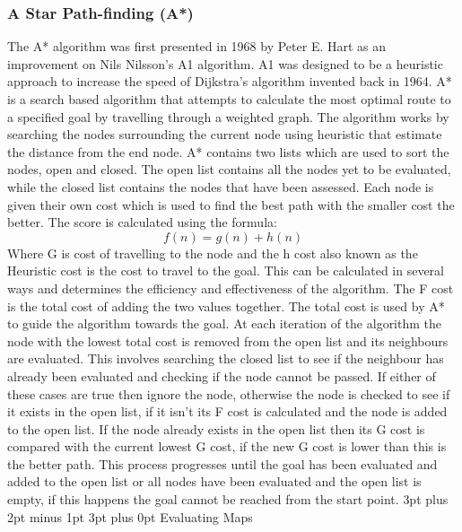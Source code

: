 \documentclass[12pt,a4paper,oneside]{book}
\makeatletter
\renewcommand\subsection{\@startsection {subsection}{1}{2mm} %
                               {3pt plus 2pt minus 1pt} %
                               {3pt plus 0pt} %
                               {\normalfont\bfseries}}
\makeatother
\begin{document}
\subsubsection{A Star Path-finding (A*)}
The A* algorithm was first presented in 1968 by Peter E. Hart as an improvement on Nils Nilsson’s A1 algorithm. A1 was designed to be a heuristic approach to increase the speed of Dijkstra’s algorithm invented back in 1964. A* is a search based algorithm that attempts to calculate the most optimal route to a specified goal by travelling through a weighted graph. 
\vspace{5mm} 
\newline
The algorithm works by searching the nodes surrounding the current node using heuristic that estimate the distance from the end node.  A* contains two lists which are used to sort the nodes, open and closed. The open list contains all the nodes yet to be evaluated, while the closed list contains the nodes that have been assessed. Each node is given their own cost which is used to find the best path with the smaller cost the better. The score is calculated using the formula:
\[f(n) = g(n) + h(n)\]  
Where G is cost of travelling to the node and the h cost also known as the Heuristic cost is the cost to travel to the goal. This can be calculated in several ways and determines the efficiency and effectiveness of the algorithm. The F cost is the total cost of adding the two values together.
\vspace{5mm} 
\newline
The total cost is used by A* to guide the algorithm towards the goal. At each iteration of the algorithm the node with the lowest total cost is removed from the open list and its neighbours are evaluated. This involves searching the closed list to see if the neighbour has already been evaluated and checking if the node cannot be passed. If either of these cases are true then ignore the node, otherwise the node is checked to see if it exists in the open list, if it isn’t its F cost is calculated and the node is added to the open list. If the node already exists in the open list then its G cost is compared with the current lowest G cost, if the new G cost is lower than this is the better path. This process progresses until the goal has been evaluated and added to the open list or all nodes have been evaluated and the open list is empty, if this happens the goal cannot be reached from the start point.
\newline
\subsection{Evaluating Maps}
\end{document}
